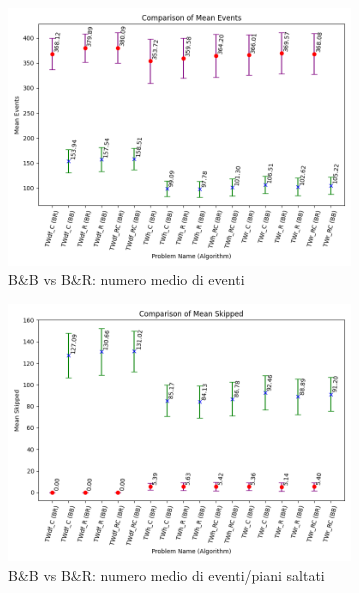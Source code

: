 \documentclass[
    article,            %
    12pt,                %
    oneside,            %
    a4paper,            %
    english,            %
    italian,                %
    sumario=tradicional,
]{abntex2}
\begin{document}
\newpage{}
\vspace*{\fill}
\begin{figure}[!h]
    \centering
    \includegraphics[width=0.81\textwidth]{Images/mean_events}
    \par
    \caption{B\&B vs B\&R: numero medio di eventi}
    \label{fig:mean_events}
\end{figure}
\begin{figure}[h!]
    \centering
    \includegraphics[width=0.81\textwidth]{Images/mean_skipped.png}
    \caption{B\&B vs B\&R: numero medio di eventi/piani saltati}
    \label{fig:mean_skipped}
\end{figure}
\vspace*{\fill}
\end{document}
